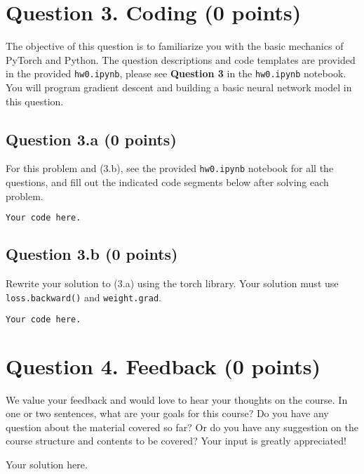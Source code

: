 \documentclass[12pt]{article}
\begin{document}
\section*{Question 3. Coding (0 points) }
The objective of this question is to familiarize you with the basic mechanics of PyTorch and Python. The question descriptions and code templates are provided in the provided \texttt{hw0.ipynb}, please see \textbf{Question 3} in the \texttt{hw0.ipynb} notebook. You will program gradient descent and building a basic neural network model in this question.

\subsection*{Question 3.a (0 points) } 
For this problem and (3.b), see the provided \texttt{hw0.ipynb} notebook for all the questions, and fill out the indicated code segments below after solving 
each problem.

\begin{solution}
\begin{lstlisting}[language=Python]
Your code here.
\end{lstlisting}
\end{solution}

\subsection*{Question 3.b (0 points) } 
Rewrite your solution to (3.a) using the torch library. Your solution must use \texttt{loss.backward()} and \texttt{weight.grad}.

\begin{solution}
\begin{lstlisting}[language=Python]
Your code here.
\end{lstlisting}
\end{solution}

\section*{Question 4. Feedback (0 points)}
We value your feedback and would love to hear your thoughts on the course. In one or two sentences, what are your goals for this course? Do you have any question about the material covered so far? Or do you have any suggestion on the course structure and contents to be covered? Your input is greatly appreciated!

\begin{solution}
Your solution here. 
\end{solution}

\newpage
\end{document}
